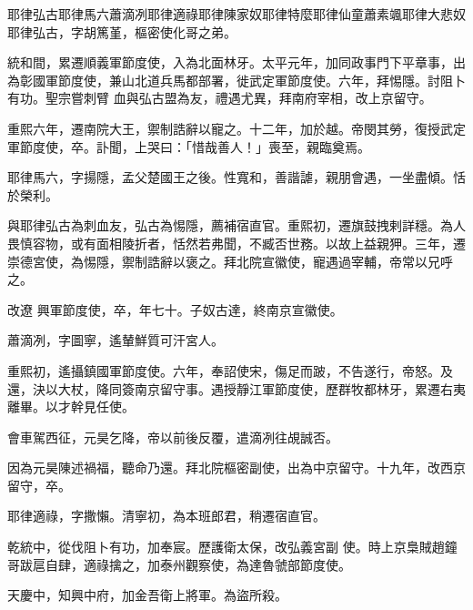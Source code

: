 
\begin{pinyinscope}

 耶律弘古耶律馬六蕭滴冽耶律適祿耶律陳家奴耶律特麼耶律仙童蕭素颯耶律大悲奴耶律弘古，字胡篤堇，樞密使化哥之弟。



 統和間，累遷順義軍節度使，入為北面林牙。太平元年，加同政事門下平章事，出為彰國軍節度使，兼山北道兵馬都部署，徙武定軍節度使。六年，拜惕隱。討阻卜有功。聖宗嘗刺臂
 血與弘古盟為友，禮遇尤異，拜南府宰相，改上京留守。



 重熙六年，遷南院大王，禦制誥辭以寵之。十二年，加於越。帝閔其勞，復授武定軍節度使，卒。訃聞，上哭曰：「惜哉善人！」喪至，親臨奠焉。



 耶律馬六，字揚隱，孟父楚國王之後。性寬和，善諧謔，親朋會遇，一坐盡傾。恬於榮利。



 與耶律弘古為刺血友，弘古為惕隱，薦補宿直官。重熙初，遷旗鼓拽剌詳穩。為人畏慎容物，或有面相陵折者，恬然若弗聞，不臧否世務。以故上益親狎。三年，遷崇德宮使，為惕隱，禦制誥辭以褒之。拜北院宣徽使，寵遇過宰輔，帝常以兄呼之。



 改遼
 興軍節度使，卒，年七十。子奴古達，終南京宣徽使。



 蕭滴冽，字圖寧，遙輦鮮質可汗宮人。



 重熙初，遙攝鎮國軍節度使。六年，奉詔使宋，傷足而跛，不告遂行，帝怒。及還，決以大杖，降同簽南京留守事。遇授靜江軍節度使，歷群牧都林牙，累遷右夷離畢。以才幹見任使。



 會車駕西征，元昊乞降，帝以前後反覆，遣滴冽往覘誠否。



 因為元昊陳述禍福，聽命乃還。拜北院樞密副使，出為中京留守。十九年，改西京留守，卒。



 耶律適祿，字撒懶。清寧初，為本班郎君，稍遷宿直官。



 乾統中，從伐阻卜有功，加奉宸。歷護衛太保，改弘義宮副
 使。時上京梟賊趙鐘哥跋扈自肆，適祿擒之，加泰州觀察使，為達魯虢部節度使。



 天慶中，知興中府，加金吾衛上將軍。為盜所殺。




\end{pinyinscope}
